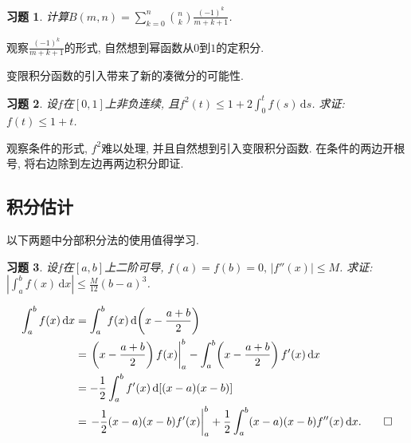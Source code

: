 \documentclass[11pt,a4paper]{ctexart}
\makeatletter
\theoremstyle{thmseries} %
\theoremstyle{exerseries}
\newtheorem{exer}{习题}[section]
\renewenvironment{proof}[1][\proofname]{\par
  \pushQED{\qed}%
  \normalfont \topsep6\p@\@plus6\p@\relax
  \trivlist
  \item[\hskip\labelsep
        \itshape
    #1\@addpunct{}]\ignorespaces
}{%
  \popQED\endtrivlist\@endpefalse
}
\newenvironment{sol}{\begin{proof}[\bfseries\upshape 解\quad]}{\end{proof}}
\newenvironment{pf}{\begin{proof}[\bfseries\upshape 证\quad]}{\end{proof}}
\newcommand{\bra}[1]{\mathopen{}\left(#1\right)}
\renewcommand{\d}{\mathrm{d}}
\makeatother
\begin{document}

\begin{exer}
	计算$B(m,n)=\sum_{k=0}^{n}\binom{n}{k}\frac{(-1)^k}{m+k+1}$. 
\end{exer}
\begin{sol}
	观察$\frac{(-1)^k}{m+k+1}$的形式, 自然想到幂函数从$0$到$1$的定积分. 
\end{sol}

变限积分函数的引入带来了新的凑微分的可能性. 
\begin{exer}
	设$f$在$[0,1]$上非负连续, 且$f^2(t)\leq1+2\int_{0}^{t}f(s)\,\d s$. 求证: $f(t)\leq1+t$. 
\end{exer}
\begin{pf}
	观察条件的形式, $f^2$难以处理, 并且自然想到引入变限积分函数. 在条件的两边开根号, 将右边除到左边再两边积分即证. 
\end{pf}


\subsection{积分估计}
以下两题中分部积分法的使用值得学习. 
\begin{exer}
	设$f$在$[a,b]$上二阶可导, $f(a)=f(b)=0,\,|f''(x)|\leq M$. 求证: $\left|\int_{a}^{b}f(x)\,\d x\right|\leq\frac{M}{12}(b-a)^3$. 	
\end{exer}
\begin{pf}
	\begin{align*}
		\int_{a}^{b}f(x)\,\d x&=\int_{a}^{b}f(x)\,\d\bra{x-\frac{a+b}{2}}\\
		&=\left.\bra{x-\frac{a+b}{2}}f(x)\right|_a^b-\int_{a}^{b}\bra{x-\frac{a+b}{2}}f'(x)\,\d x\\
		&=-\frac{1}{2}\int_{a}^{b}f'(x)\,\d[(x-a)(x-b)]\\
		&=\left.-\frac{1}{2}(x-a)(x-b)f'(x)\right|_a^b+\frac{1}{2}\int_{a}^{b}(x-a)(x-b)f''(x)\,\d x.\qedhere
	\end{align*}
\end{pf}

\end{document}
